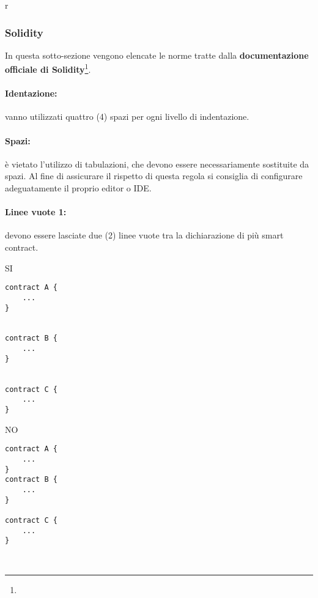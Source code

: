 r\documentclass[../ProcessiPrimari.tex]{subfiles}
\begin{document}
	
\subsubsection{Solidity}
In questa sotto-sezione vengono elencate le norme tratte dalla \textbf{documentazione officiale di Solidity}\footnote{}.
\paragraph*{Identazione: }
vanno utilizzati quattro (4) spazi per ogni livello di indentazione.
\paragraph*{Spazi: }
è vietato l'utilizzo di tabulazioni, che devono essere necessariamente sostituite da spazi. Al fine di assicurare il rispetto di questa regola si consiglia di configurare adeguatamente il proprio editor o IDE.
\paragraph*{Linee vuote 1: }
devono essere lasciate due (2) linee vuote tra la dichiarazione di più smart contract.
\begin{center}{
\begin{minipage}{6cm}
{\begin{center}SI\end{center}}
\begin{Verbatim}[frame=single]
contract A {
    ...
}


contract B {
    ...
}


contract C {
    ...
}
\end{Verbatim}
\end{minipage}
\hfil
\begin{minipage}{6cm}
{\begin{center}NO\end{center}}
\begin{Verbatim}[frame=single]
contract A {
    ...
}
contract B {
    ...
}

contract C {
    ...
}



\end{Verbatim}
\end{minipage}
}
\end{center}
\end{document}
